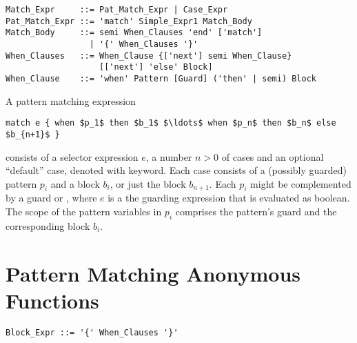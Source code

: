 \syntax\begin{lstlisting}
Match_Expr     ::= Pat_Match_Expr | Case_Expr
Pat_Match_Expr ::= 'match' Simple_Expr1 Match_Body
Match_Body     ::= semi When_Clauses 'end' ['match']
                 | '{' When_Clauses '}'
When_Clauses   ::= When_Clause {['next'] semi When_Clause} 
                   [['next'] 'else' Block]
When_Clause    ::= 'when' Pattern [Guard] ('then' | semi) Block
\end{lstlisting}

A pattern matching expression 
\begin{lstlisting}
match e { when $p_1$ then $b_1$ $\ldots$ when $p_n$ then $b_n$ else $b_{n+1}$ }
\end{lstlisting}
consists of a selector expression $e$, a number $n > 0$ of cases and an optional ``default'' case, denoted with  keyword. Each case consists of a (possibly guarded) pattern $p_i$ and a block $b_i$, or just the block $b_{n+1}$. Each $p_i$ might be complemented by a guard  or , where $e$ is a the guarding expression that is evaluated as boolean. The scope of the pattern variables in $p_i$ comprises the pattern's guard and the corresponding block $b_i$. 





\section{Pattern Matching Anonymous Functions}

\syntax\begin{lstlisting}
Block_Expr ::= '{' When_Clauses '}'
\end{lstlisting}



